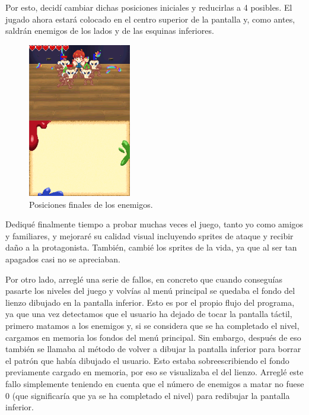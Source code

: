 \vspace{0.5cm}

Por esto, decidí cambiar dichas posiciones iniciales y reducirlas a 4 posibles. El jugado ahora estará colocado en el centro superior de la pantalla y, como antes, saldrán enemigos de los lados y de las esquinas inferiores.

\vspace{0.5cm}


\begin{figure}[htbp]
\centering
  \includegraphics[width=0.4\textwidth]{archivos/finale.png}
  \caption{Posiciones finales de los enemigos.}
  \label{fig:finale}
\end{figure}

\vspace{0.5cm}

Dediqué finalmente tiempo a probar muchas veces el juego, tanto yo como amigos y familiares, y mejoraré su calidad visual incluyendo sprites de ataque y recibir daño a la protagonista. También, cambié los sprites de la vida, ya que al ser tan apagados casi no se apreciaban. 

\vspace{0.5cm}

Por otro lado, arreglé una serie de fallos, en concreto que cuando conseguías pasarte los niveles del juego y volvías al menú principal se quedaba el fondo del lienzo dibujado en la pantalla inferior. Esto es por el propio flujo del programa, ya que una vez detectamos que el usuario ha dejado de tocar la pantalla táctil, primero matamos a los enemigos y, si se considera que se ha completado el nivel, cargamos en memoria los fondos del menú principal. Sin embargo, después de eso también se llamaba al método de volver a dibujar la pantalla inferior para borrar el patrón que había dibujado el usuario. Esto estaba sobreescribiendo el fondo previamente cargado en memoria, por eso se visualizaba el del lienzo. Arreglé este fallo simplemente teniendo en cuenta que el número de enemigos a matar no fuese 0 (que significaría que ya se ha completado el nivel) para redibujar la pantalla inferior.

